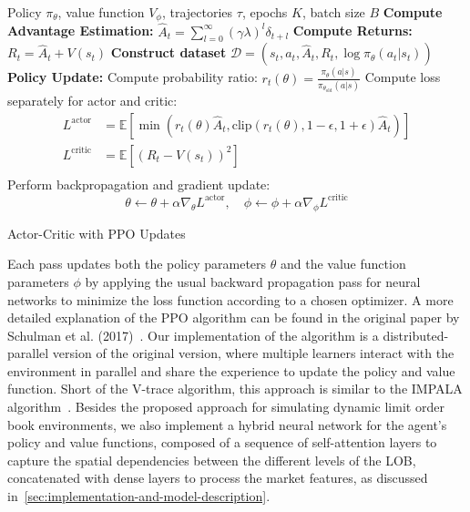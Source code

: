 \begin{algorithm}
    \begin{algorithmic}[1]
        \Require Policy $\pi_\theta$, value function $V_\phi$, trajectories $\tau$, epochs $K$, batch size $B$
        \State \textbf{Compute Advantage Estimation:}
        \State $\hat{A}_t = \sum_{l=0}^{\infty} (\gamma \lambda)^l \delta_{t+l}$
        \State \textbf{Compute Returns:} $R_t = \hat{A}_t + V(s_t)$
        \State \textbf{Construct dataset} $\mathcal{D} = (s_t, a_t, \hat{A}_t, R_t, \log \pi_\theta(a_t | s_t))$
                \State \textbf{Policy Update:}
                \State Compute probability ratio:
                \(
                r_t(\theta) = \frac{\pi_\theta(a | s)}{\pi_{\theta_{\text{old}}}(a | s)}
                \)
                \State Compute loss separately for actor and critic:
                \begin{equation*}
                    \begin{aligned}
                        L^{\text{actor}} &= \mathbb{E} \left[ \min(r_t(\theta) \hat{A}_t, \text{clip}(r_t(\theta), 1 - \epsilon, 1 + \epsilon) \hat{A}_t) \right]\\
                        L^{\text{critic}} &= \mathbb{E} \left[ (R_t - V(s_t))^2 \right]\\
                    \end{aligned}
                \end{equation*}
                \State Perform backpropagation and gradient update:
                \[
                    \theta \gets \theta + \alpha \nabla_\theta L^{\text{actor}}, \quad \phi \gets \phi + \alpha \nabla_\phi L^{\text{critic}}
                \]
            \EndFor
        \EndFor
    \end{algorithmic}
    \caption{Actor-Critic with PPO Updates}
    \label{alg:ppo}
\end{algorithm}

Each pass updates both the policy parameters $\theta$ and the value function parameters $\phi$
by applying the usual backward propagation pass for neural networks to minimize the loss function according to a chosen optimizer.
A more detailed explanation of the PPO algorithm can be found in the original paper by Schulman et al. (2017)~\cite{Schulman2017}.
Our implementation of the algorithm is a distributed-parallel version of the original version,
where multiple learners interact with the environment in parallel and share the experience to update the policy and value function.
Short of the V-trace algorithm, this approach is similar to the IMPALA algorithm~\cite{Espeholt2018}.
Besides the proposed approach for simulating dynamic limit order book environments,
we also implement a hybrid neural network for the agent's policy and value functions,
composed of a sequence of self-attention layers to capture the spatial dependencies between the different levels of the LOB,
concatenated with dense layers to process the market features, as discussed in~\autoref{sec:implementation-and-model-description}.

